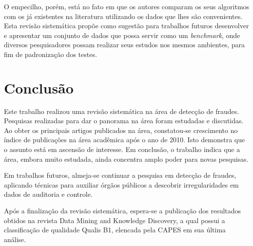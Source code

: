 \documentclass[smallextended]{svjour3}
\begin{document}
O empecilho, porém, está no fato em que os autores comparam os seus algoritmos com os já existentes na literatura utilizando os dados que lhes são convenientes. Esta revisão sistemática propõe como sugestão para trabalhos futuros desenvolver e apresentar um conjunto de dados que possa servir como um \emph{benchmark}, onde diversos pesquisadores possam realizar seus estudos nos mesmos ambientes, para fim de padronização dos testes. 

\section{Conclusão}
\label{sec:6}

Este trabalho realizou uma revisão sistemática na área de detecção de fraudes. Pesquisas realizadas para dar o panorama na área foram estudadas e discutidas. Ao obter os principais artigos publicados na área, constatou-se crescimento no índice de publicações na área acadêmica após o ano de 2010. Isto demonstra que o assunto está em ascensão de interesse. Em conclusão, o trabalho indica que a área, embora muito estudada, ainda concentra amplo poder para novas pesquisas.

Em trabalhos futuros, almeja-se continuar a pesquisa em detecção de fraudes, aplicando técnicas para auxiliar órgãos públicos a descobrir irregularidades em dados de auditoria e controle.

Após a finalização da revisão sistemática, espera-se a publicação dos resultados obtidos na revista Data Mining and Knowledge Discovery, a qual possui a classificação de qualidade Qualis B1, elencada pela CAPES em sua última análise. 

	
	
	
\end{document}

